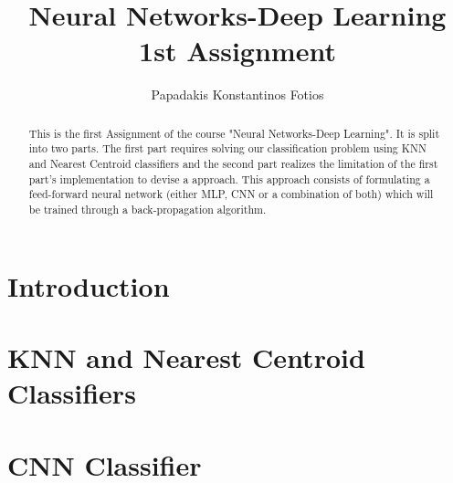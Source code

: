 \documentclass[lettersize,journal]{IEEEtran}
\begin{document}
\title{Neural Networks-Deep Learning \\ 1st Assignment}
\author{Papadakis Konstantinos Fotios}
\maketitle

\begin{abstract}
This is the first Assignment of the course "Neural Networks-Deep Learning". It is split into two parts.
The first part requires solving our classification problem using KNN and Nearest Centroid classifiers and 
the second part realizes the limitation of the first part's implementation to devise a approach. This 
approach consists of formulating a feed-forward neural network (either MLP, CNN or a combination of both)
which will be trained through a back-propagation algorithm.
\end{abstract}

\section{Introduction}
 

\section{KNN and Nearest Centroid Classifiers}


\section{CNN Classifier}


\vfill
\end{document}
